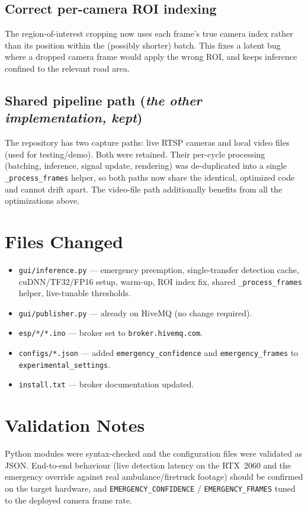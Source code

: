 \documentclass[11pt]{article}
\begin{document}
\subsection{Correct per-camera ROI indexing}
The region-of-interest cropping now uses each frame's true camera index rather
than its position within the (possibly shorter) batch. This fixes a latent bug
where a dropped camera frame would apply the wrong ROI, and keeps inference
confined to the relevant road area.

\subsection{Shared pipeline path (\emph{the other implementation, kept})}
The repository has two capture paths: live RTSP cameras and local video files
(used for testing/demo). Both were retained. Their per-cycle processing
(batching, inference, signal update, rendering) was de-duplicated into a single
\texttt{\_process\_frames} helper, so both paths now share the identical,
optimized code and cannot drift apart. The video-file path additionally
benefits from all the optimizations above.

\section{Files Changed}
\begin{itemize}[nosep]
  \item \texttt{gui/inference.py} --- emergency preemption, single-transfer
        detection cache, cuDNN/TF32/FP16 setup, warm-up, ROI index fix, shared
        \texttt{\_process\_frames} helper, live-tunable thresholds.
  \item \texttt{gui/publisher.py} --- already on HiveMQ (no change required).
  \item \texttt{esp/*/*.ino} --- broker set to \texttt{broker.hivemq.com}.
  \item \texttt{configs/*.json} --- added \texttt{emergency\_confidence} and
        \texttt{emergency\_frames} to \texttt{experimental\_settings}.
  \item \texttt{install.txt} --- broker documentation updated.
\end{itemize}

\section{Validation Notes}
Python modules were syntax-checked and the configuration files were validated
as JSON. End-to-end behaviour (live detection latency on the RTX~2060 and the
emergency override against real ambulance/firetruck footage) should be
confirmed on the target hardware, and \texttt{EMERGENCY\_CONFIDENCE} /
\texttt{EMERGENCY\_FRAMES} tuned to the deployed camera frame rate.
\end{document}
